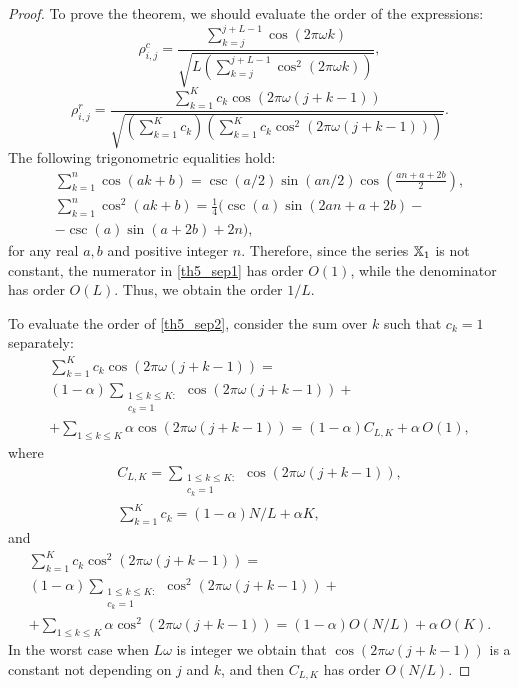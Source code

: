 \documentclass[sii]{ipart}
\begin{document}
\begin{proof}
To prove the theorem, we should evaluate the order of the expressions:
	\begin{equation}\label{th5_sep1}
	\rho^c_{i,j} = \frac{\sum_{k=j}^{j + L - 1} \cos(2 \pi \omega k)}{\sqrt{L \left(\sum_{k=j}^{j + L - 1} \cos^2(2 \pi \omega k)\right)}},
	\end{equation}
	\begin{equation}\label{th5_sep2}
	\rho^r_{i,j} = \frac{\sum_{k=1}^K c_k\cos(2 \pi \omega (j + k - 1))}{\sqrt{\left(\sum_{k=1}^K c_k\right) \left(\sum_{k=1}^K c_k\cos^2(2 \pi \omega (j + k - 1))\right)}}.
	\end{equation}
	The following trigonometric equalities hold:
	\begin{multline*}
	\sum_{k=1}^n \cos(ak + b) = \csc(a/2) \sin(an / 2) \cos \left(\frac{an + a + 2b}{2} \right), \\
	\sum_{k=1}^n \cos^2(ak + b) = \frac{1}{4}(\csc(a) \sin(2an + a + 2b) -\\ - \csc(a)\sin(a + 2b) + 2n),
	\end{multline*}
	for any real $a, b$ and positive integer $n$.
	Therefore, since the series $\mathbb{X}_1$ is not constant, the numerator in \eqref{th5_sep1} has order $O(1)$, while the denominator has order $O(L)$. Thus, we obtain the order $1/L$.
	
	To evaluate the order of \eqref{th5_sep2}, consider the sum over $k$ such that $c_k=1$ separately:
	\begin{multline*}
	\sum_{k=1}^K c_k\cos(2 \pi \omega (j + k - 1)) = \\ (1-\alpha) \sum_{\substack{1 \le k \le K: \\ c_k = 1}}\cos(2 \pi \omega (j + k - 1)) +\\ +\sum_{1 \le k \le K}\alpha \cos(2 \pi \omega (j + k - 1)) = (1-\alpha) C_{L,K} + \alpha\, O(1),
	\end{multline*}
where
    \begin{gather*}
	C_{L, K} = \sum_{\substack{1 \le k \le K: \\ c_k = 1}}\cos(2 \pi \omega (j + k - 1)),
	\\
	\sum_{k=1}^K c_k = (1-\alpha) N/L + \alpha K,
	\end{gather*}
and
    \begin{multline*}
	\sum_{k=1}^K c_k\cos^2(2 \pi \omega (j + k - 1)) = \\ (1-\alpha)\sum_{\substack{1 \le k \le K: \\ c_k = 1}}\cos^2(2 \pi \omega (j + k - 1)) +\\ +\sum_{1 \le k \le K }\alpha \cos^2(2 \pi \omega (j + k - 1)) = (1-\alpha) O(N/L) + \alpha\, O(K).
    \end{multline*}
	In the worst case when $L\omega$ is integer we obtain that $\cos(2 \pi \omega (j + k - 1))$ is a constant not depending on $j$ and $k$, and then $C_{L,K}$ has order $O(N/L)$.
\end{proof}
\end{document}

